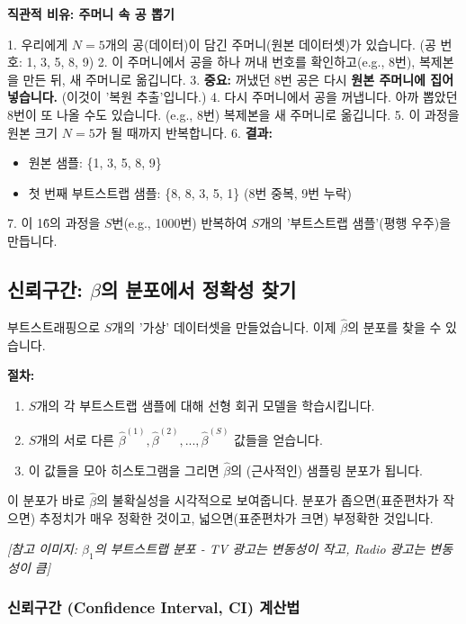 \documentclass[11pt,a4paper]{book}
\theoremstyle{definition}
\begin{document}
\begin{infobox}
\textbf{직관적 비유: 주머니 속 공 뽑기}

1.  우리에게 $N=5$개의 공(데이터)이 담긴 주머니(원본 데이터셋)가 있습니다. (공 번호: 1, 3, 5, 8, 9)
2.  이 주머니에서 공을 하나 꺼내 번호를 확인하고(e.g., 8번), 복제본을 만든 뒤, 새 주머니로 옮깁니다.
3.  \textbf{중요:} 꺼냈던 8번 공은 다시 \textbf{원본 주머니에 집어넣습니다.} (이것이 '복원 추출'입니다.)
4.  다시 주머니에서 공을 꺼냅니다. 아까 뽑았던 8번이 또 나올 수도 있습니다. (e.g., 8번) 복제본을 새 주머니로 옮깁니다.
5.  이 과정을 원본 크기 $N=5$가 될 때까지 반복합니다.
6.  \textbf{결과:}
    \begin{itemize}
        \item 원본 샘플: \{1, 3, 5, 8, 9\}
        \item 첫 번째 부트스트랩 샘플: \{8, 8, 3, 5, 1\} (8번 중복, 9번 누락)
    \end{itemize}
7.  이 1\~6의 과정을 $S$번(e.g., 1000번) 반복하여 $S$개의 '부트스트랩 샘플'(평행 우주)을 만듭니다.
\end{infobox}

\subsection{신뢰구간: $\beta$의 분포에서 정확성 찾기}

부트스트래핑으로 $S$개의 '가상' 데이터셋을 만들었습니다. 이제 $\hat{\beta}$의 분포를 찾을 수 있습니다.

\textbf{절차:}
\begin{enumerate}
    \item $S$개의 각 부트스트랩 샘플에 대해 선형 회귀 모델을 학습시킵니다.
    \item $S$개의 서로 다른 $\hat{\beta}^{(1)}, \hat{\beta}^{(2)}, ..., \hat{\beta}^{(S)}$ 값들을 얻습니다.
    \item 이 값들을 모아 히스토그램을 그리면 $\hat{\beta}$의 (근사적인) 샘플링 분포가 됩니다.
\end{enumerate}

이 분포가 바로 $\hat{\beta}$의 불확실성을 시각적으로 보여줍니다. 분포가 좁으면(표준편차가 작으면) 추정치가 매우 정확한 것이고, 넓으면(표준편차가 크면) 부정확한 것입니다.

\textit{[참고 이미지: $\hat{\beta}_1$의 부트스트랩 분포 - TV 광고는 변동성이 작고, Radio 광고는 변동성이 큼]}

\subsubsection{신뢰구간 (Confidence Interval, CI) 계산법}
\end{document}
